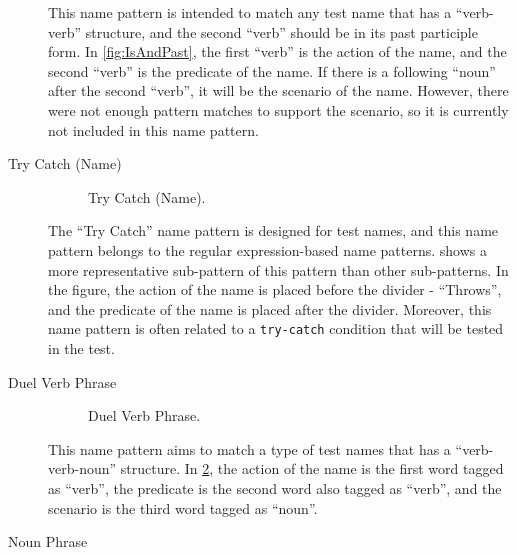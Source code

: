\begin{description}
This name pattern is intended to match any test name that has a \enquote{verb-verb} structure, and the second \enquote{verb} should be in its past participle form.
%
In \cref{fig:IsAndPast}, the first \enquote{verb} is the action of the name, and the second \enquote{verb} is the predicate of the name.
%
If there is a following \enquote{noun} after the second \enquote{verb}, it will be the scenario of the name.
%
However, there were not enough pattern matches to support the scenario, so it is currently not included in this name pattern. 


\item[Try Catch (Name)]

\begin{figure}[htbp]
\centering
    \begin{subfigure}{0.65\textwidth}
    \end{subfigure}
\caption{Try Catch (Name).}
\label{fig:try-catch}
\end{figure}

The \enquote{Try Catch} name pattern is designed for test names, and this name pattern belongs to the regular expression-based name patterns.
%
 shows a more representative sub-pattern of this pattern than other sub-patterns.
%
In the figure, the action of the name is placed before the divider - \enquote{Throws}, and the predicate of the name is placed after the divider.
%
Moreover, this name pattern is often related to a \texttt{try-catch} condition that will be tested in the test.

\item[Duel Verb Phrase]

\begin{figure}[H]
\centering
    \begin{subfigure}{0.65\textwidth}
    \end{subfigure}
\caption{Duel Verb Phrase.}
\label{fig:dual-verb}
\end{figure}

This name pattern aims to match a type of test names that has a \enquote{verb-verb-noun} structure.
%
In \cref{fig:dual-verb}, the action of the name is the first word tagged as \enquote{verb}, the predicate is the second word also tagged as \enquote{verb}, and the scenario is the third word tagged as \enquote{noun}.


\item[Noun Phrase]


\end{description}
